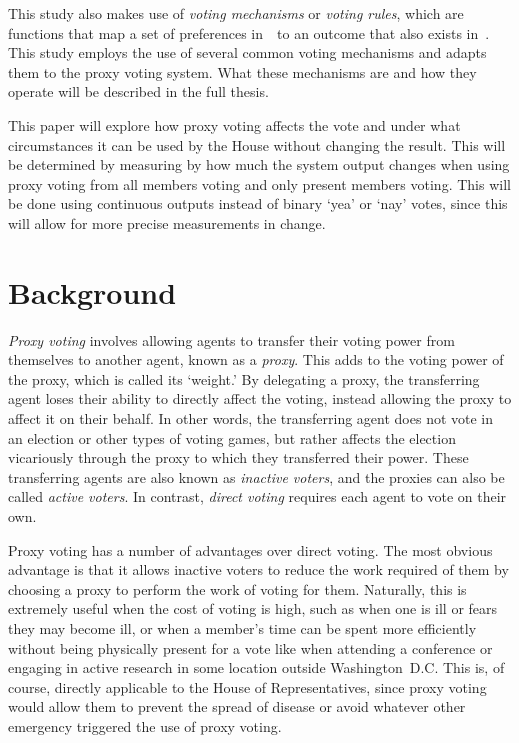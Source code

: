 This study also makes use of \textit{voting mechanisms} or \textit{voting rules},
which are functions that map a set of preferences in~\systemspace\ to an outcome that
also exists in~\systemspace.
%
%
This study employs the use of several common voting mechanisms and adapts them to the
proxy voting system.
What these mechanisms are and how they operate will be described in the full thesis.

This paper will explore how proxy voting affects the vote and under what
circumstances it can be used by the House without changing the result.
This will be determined by measuring by how much the system output changes when using
proxy voting from all members voting and only present members voting.
This will be done using continuous outputs instead of binary `yea' or `nay' votes,
since this will allow for more precise measurements in change.


\section{Background}\label{sec:background}
\textit{Proxy voting} involves allowing agents to transfer their voting power
from themselves to another agent, known as a \textit{proxy}.
This adds to the voting power of the proxy, which is called its `weight.'
By delegating a proxy, the transferring agent loses their ability to directly affect the
voting, instead allowing the proxy to affect it on their behalf.
In other words, the transferring agent does not vote in an election or other types of
voting games, but rather affects the election vicariously through the proxy to which
they transferred their power.
These transferring agents are also known as \textit{inactive voters}, and the
proxies can also be called \textit{active voters}.
In contrast, \textit{direct voting} requires each agent to vote on their own.

Proxy voting has a number of advantages over direct voting.
The most obvious advantage is that it allows inactive voters to reduce the work
required of them by choosing a proxy to perform the work of voting for them.
Naturally, this is extremely useful when the cost of voting is high, such as
when one is ill or fears they may become ill, or when a member's time can be spent
more efficiently without being physically present for a vote like when attending a
conference or engaging in active research in some location outside Washington~D.C.
This is, of course, directly applicable to the House of Representatives, since proxy
voting would allow them to prevent the spread of disease or avoid whatever other
emergency triggered the use of proxy voting.

